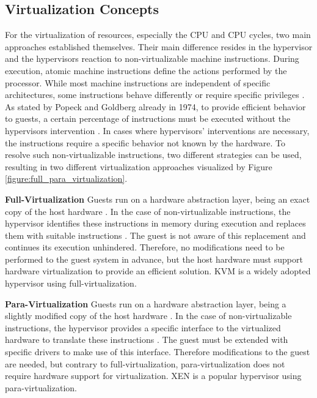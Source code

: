        
        \subsection{Virtualization Concepts}
        \label{subsection:concepts}
        
            For the virtualization of resources, especially the \ac{CPU} and \ac{CPU} cycles, two main approaches established themselves.
            Their main difference resides in the hypervisor and the hypervisors reaction to non-virtualizable machine instructions.
            During execution, atomic machine instructions define the actions performed by the processor. 
            While most machine instructions are independent of specific architectures, some instructions behave differently or require specific privileges \cite{Marinescu2018}.
            As stated by Popeck and Goldberg already in 1974, to provide efficient behavior to guests, a certain percentage of instructions must be executed without the hypervisors intervention \cite{Popek1974}.
            In cases where hypervisors' interventions are necessary, the instructions require a specific behavior not known by the hardware. 
            To resolve such non-virtualizable instructions, two different strategies can be used, resulting in two different virtualization approaches visualized by Figure \ref{figure:full_para_virtualization}.
            
            \noindent \textbf{Full-Virtualization} 
            Guests run on a hardware abstraction layer, being an exact copy of the host hardware \cite{Marinescu2018}. 
            In the case of non-virtualizable instructions, the hypervisor identifies these instructions in memory during execution and replaces them with suitable instructions \cite{Binu2011}.
            The guest is not aware of this replacement and continues its execution unhindered.
            Therefore, no modifications need to be performed to the guest system in advance, but the host hardware must support hardware virtualization to provide an efficient solution. 
            \ac{KVM} is a widely adopted hypervisor using full-virtualization.
            
            \noindent \textbf{Para-Virtualization} 
            Guests run on a hardware abstraction layer, being a slightly modified copy of the host hardware \cite{Marinescu2018}. 
            In the case of non-virtualizable instructions, the hypervisor provides a specific interface to the virtualized hardware to translate these instructions \cite{Binu2011}.
            The guest must be extended with specific drivers to make use of this interface.
            Therefore modifications to the guest are needed, but contrary to full-virtualization, para-virtualization does not require hardware support for virtualization.
            XEN is a popular hypervisor using para-virtualization.
            

